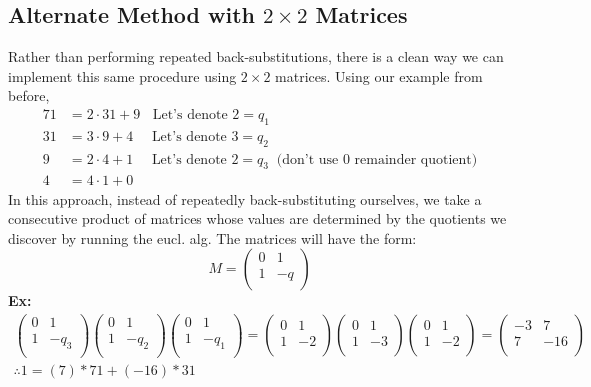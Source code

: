 \subsection{Alternate Method with $2\times 2$ Matrices}
Rather than performing repeated back-substitutions, there is a clean way we can implement this same
procedure using $2\times 2$ matrices. Using our example from before,\\
\begin{align}
    71&= 2\cdot 31+9 \ \ \ \ \text{Let's denote }2=q_1\nonumber\\
    31&= 3\cdot 9+4 \ \ \ \ \ \ \text{Let's denote }3=q_2\nonumber\\
    9&= 2\cdot 4+1 \ \ \ \ \ \ \text{Let's denote }2=q_3 \ \text{ (don't use 0 remainder quotient)}\nonumber\\ \hline
    4&= 4\cdot 1+0 \nonumber
\end{align}
In this approach, instead of repeatedly back-substituting ourselves, we take a consecutive product
of matrices whose values are determined by the quotients we discover by running the eucl. alg. The
matrices will have the form:
\begin{equation}
   M=
  \left( {\begin{array}{cc}
   0 & 1 \\
   1 & -q \\
  \end{array} } \right)
\nonumber
\end{equation}
\textbf{Ex:}
\begin{align}
  \left( {\begin{array}{cc}
   0 & 1 \\
   1 & -q_3 \\
  \end{array} } \right)\left( {\begin{array}{cc}
   0 & 1 \\
   1 & -q_2 \\
  \end{array} } \right)\left( {\begin{array}{cc}
   0 & 1 \\
   1 & -q_1 \\
  \end{array} } \right)
  =\left( {\begin{array}{cc}
   0 & 1 \\
   1 & -2 \\
  \end{array} } \right)\left( {\begin{array}{cc}
   0 & 1 \\
   1 & -3 \\
  \end{array} } \right)\left( {\begin{array}{cc}
   0 & 1 \\
   1 & -2 \\
  \end{array} } \right)=\left( {\begin{array}{cc}
   -3 & 7 \\
   7 & -16 \\
  \end{array} } \right) \nonumber\\
  \therefore 1= (7)*71+(-16)*31
\nonumber
\end{align}
